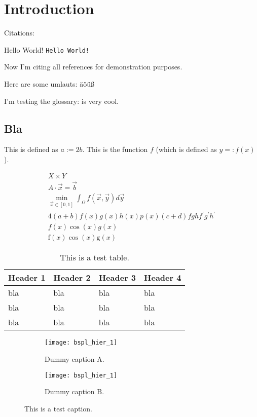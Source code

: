 
\chapter{Introduction}


Citations:
\cite{boor72}

Hello World! \texttt{Hello World!}

Now I'm citing all references for demonstration purposes.
\nocite{*}

Here are some umlauts: äöüß

I'm testing the glossary:
\sgpp is very cool.

\section{Bla}

This is defined as $a := 2b$.
This is the function $f$ (which is defined as $y =: f(x)$).

\begin{gather}
  X \times Y\\
  A \cdot \vec{x} = \vec{b}\\
  \min_{\vec{x} \in [0, 1]} \int_\Omega f(\vec{x}, \vec{y}) d\vec{y}\\
  4(a+b)f(x)g(x)h(x)p(x)(c+d)fghf^\prime g^\prime h^\prime\\
  f(x)\cos(x)g(x)\\
  \mathrm{f}(x)\cos(x)\mathrm{g}(x)
\end{gather}

\begin{table}
  \begin{tabular}{llll}
    \toprule
    \textbf{Header 1}&\textbf{Header 2}&\textbf{Header 3}&\textbf{Header 4}\\
    \midrule
    bla&bla&bla&bla\\
    bla&bla&bla&bla\\
    bla&bla&bla&bla\\
    \bottomrule
  \end{tabular}
  \caption{This is a test table.}
  \label{tbl:test}
\end{table}

\begin{figure}
  \begin{subfigure}{65mm}
    \texttt{[image: bspl\_hier\_1]}
    \caption{Dummy caption A.}
    \label{fig:test1a}
  \end{subfigure}
  \hspace{3mm}
  \begin{subfigure}{65mm}
    \texttt{[image: bspl\_hier\_1]}
    \caption{Dummy caption B.}
    \label{fig:test1b}
  \end{subfigure}
  \caption{This is a test caption.}
  \label{fig:test1}
\end{figure}

